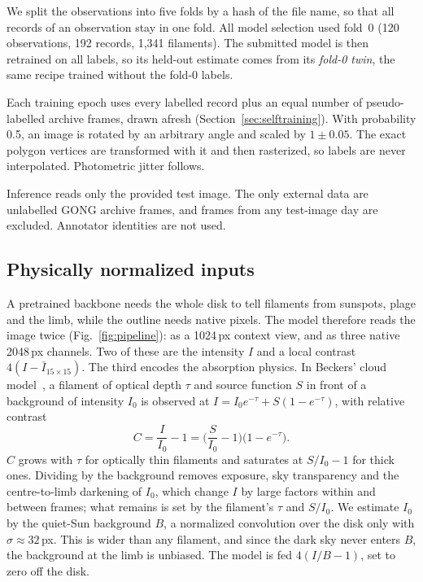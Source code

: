 \documentclass[sigconf]{acmart}
\begin{document}
We split the observations into five folds by a hash of the file name, so that all records of an observation stay in one fold. All model selection used fold~0 (120 observations, 192 records, 1,341 filaments). The submitted model is then retrained on all labels, so its held-out estimate comes from its \emph{fold-0 twin}, the same recipe trained without the fold-0 labels.

Each training epoch uses every labelled record plus an equal number of pseudo-labelled archive frames, drawn afresh (Section~\ref{sec:selftraining}). With probability 0.5, an image is rotated by an arbitrary angle and scaled by $1\pm0.05$. The exact polygon vertices are transformed with it and then rasterized, so labels are never interpolated. Photometric jitter follows.

Inference reads only the provided test image. The only external data are unlabelled GONG archive frames, and frames from any test-image day are excluded. Annotator identities are not used.

\subsection{Physically normalized inputs}
A pretrained backbone needs the whole disk to tell filaments from sunspots, plage and the limb, while the outline needs native pixels. The model therefore reads the image twice (Fig.~\ref{fig:pipeline}): as a 1024\,px context view, and as three native 2048\,px channels. Two of these are the intensity $I$ and a local contrast $4(I-\bar I_{15\times15})$. The third encodes the absorption physics. In Beckers' cloud model~\cite{beckers1964cloud}, a filament of optical depth $\tau$ and source function $S$ in front of a background of intensity $I_0$ is observed at $I=I_0e^{-\tau}+S(1-e^{-\tau})$, with relative contrast
\begin{equation}
C=\frac{I}{I_0}-1=\Big(\frac{S}{I_0}-1\Big)\big(1-e^{-\tau}\big).
\label{eq:cloud}
\end{equation}
$C$ grows with $\tau$ for optically thin filaments and saturates at $S/I_0-1$ for thick ones. Dividing by the background removes exposure, sky transparency and the centre-to-limb darkening of $I_0$, which change $I$ by large factors within and between frames; what remains is set by the filament's $\tau$ and $S/I_0$. We estimate $I_0$ by the quiet-Sun background $B$, a normalized convolution over the disk only with $\sigma\approx32$\,px. This is wider than any filament, and since the dark sky never enters $B$, the background at the limb is unbiased. The model is fed $4(I/B-1)$, set to zero off the disk.
\end{document}
